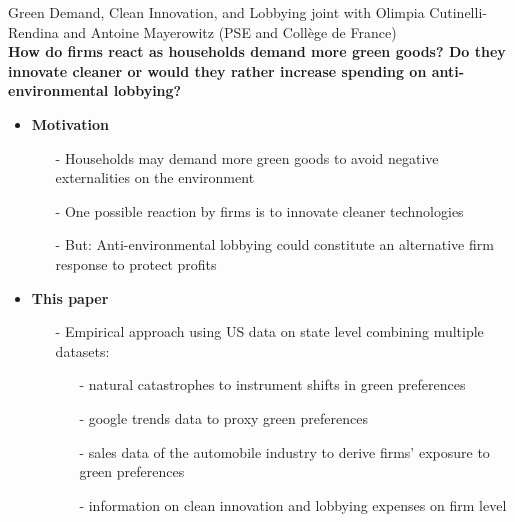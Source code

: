 \begin{frame}{Green Demand, Clean Innovation, and Lobbying}
	\vspace{-5mm}
\hspace{-6mm}\footnotesize{joint with Olimpia Cutinelli-Rendina and Antoine Mayerowitz (PSE and Collège de France)}\\

\footnotesize
\vspace{3mm}
\textbf{\alert{How do firms react as households demand more green goods? Do they innovate cleaner or would they rather increase spending on anti-environmental lobbying?}}
\begin{itemize}
 \item \textbf{Motivation }
 \begin{itemize}
 	\item[-] Households may demand more green goods to avoid negative externalities on the environment \footnotesize{\citep{Benabou2010IndividualResponsibility, Vermeir2006SustainableGap}}
 	\item[-] One possible reaction by firms is to innovate cleaner technologies \footnotesize{\citep{Aghion2021EnvironmentalDirty}}
 	\item[-] But: Anti-environmental lobbying could constitute an alternative firm response to protect profits
 \end{itemize}
\item \textbf{This paper}
\begin{itemize}
	\item[-] Empirical approach using US data on state level combining multiple datasets:
	\begin{itemize}
		\item[-] natural catastrophes to instrument shifts in green preferences
		\item[-] google trends data to proxy green preferences
		\item[-] sales data of the automobile industry to derive firms' exposure to green preferences
		\item[-] information on clean innovation and lobbying expenses on firm level
	\end{itemize}
\end{itemize}
\end{itemize}
\end{frame}

